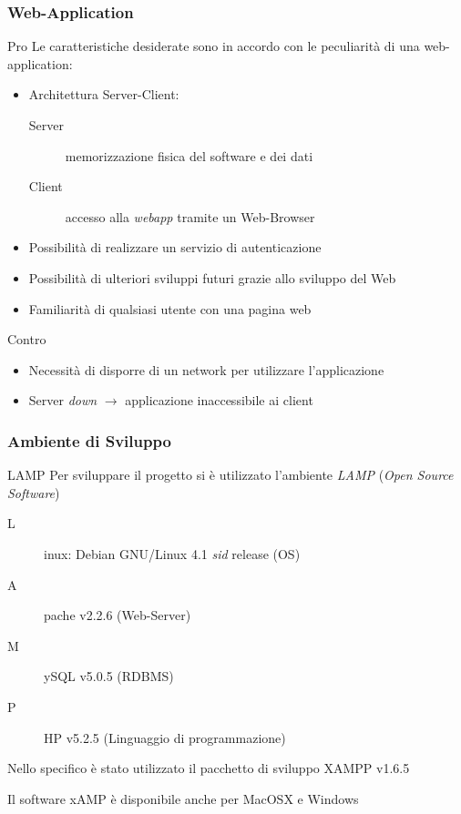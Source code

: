 \begin{frame}
\frametitle{Web-Application}
\begin{block}{Pro}
Le caratteristiche desiderate sono in accordo con le peculiarità di una web-application:
\begin{itemize}
\item Architettura Server-Client:
\begin{description}
\item [Server] memorizzazione fisica del software e dei dati
\item [Client] accesso alla \emph{webapp} tramite un Web-Browser
\end{description}
\item Possibilità di realizzare un servizio di autenticazione
\item Possibilità di ulteriori sviluppi futuri grazie allo sviluppo del Web
\item Familiarità di qualsiasi utente con una pagina web
\end{itemize}
\end{block}
\begin{block}{Contro}
\begin{itemize}
\item Necessità di disporre di un network per utilizzare l'applicazione
\item Server \emph{down} $\rightarrow$ applicazione inaccessibile ai client
\end{itemize}
\end{block}
\end{frame}

\begin{frame}
\frametitle{Ambiente di Sviluppo}
\begin{block}{LAMP}
Per sviluppare il progetto si è utilizzato l'ambiente
\emph{LAMP} (\emph{Open Source Software})
\begin{description}
\item [L]inux: Debian GNU/Linux 4.1 \emph{sid} release (OS)
\item [A]pache v2.2.6 (Web-Server)
\item [M]ySQL v5.0.5 (RDBMS)
\item [P]HP v5.2.5 (Linguaggio di programmazione)
\end{description}
Nello specifico è stato utilizzato il pacchetto di
sviluppo XAMPP v1.6.5
\end{block}
\begin{block}{}
Il software xAMP è disponibile anche per MacOSX\cpr{} e Windows\cpr{}
\end{block}
\end{frame}

